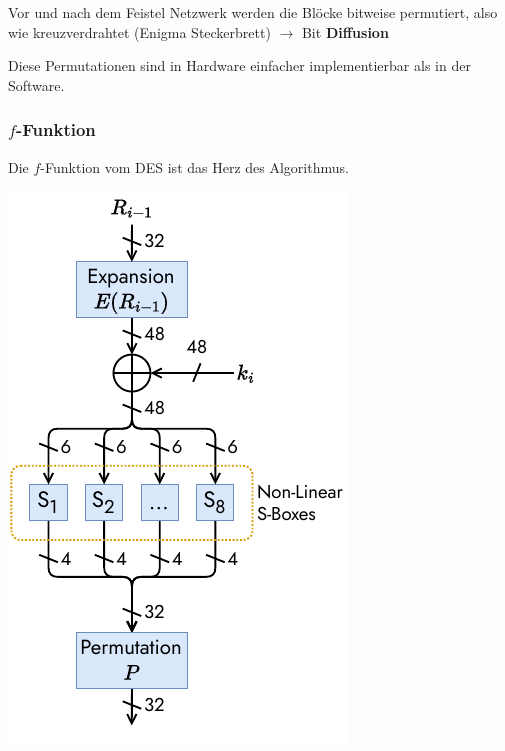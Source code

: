 \documentclass[
  10pt,
  a4paper,
  twocolumn]{article}
\begin{document}
Vor und nach dem Feistel Netzwerk werden die Blöcke bitweise permutiert,
also wie kreuzverdrahtet (Enigma Steckerbrett) \(\rightarrow\) Bit
\textbf{Diffusion}

\begin{tcolorbox}[enhanced jigsaw, colframe=quarto-callout-note-color-frame, bottomrule=.15mm, colback=white, left=2mm, toprule=.15mm, arc=.35mm, coltitle=black, opacityback=0, rightrule=.15mm, title=\textcolor{quarto-callout-note-color}{\faInfo}\hspace{0.5em}{Hinweis}, colbacktitle=quarto-callout-note-color!10!white, opacitybacktitle=0.6, toptitle=1mm, bottomtitle=1mm, titlerule=0mm, leftrule=.75mm, breakable]

Diese Permutationen sind in Hardware einfacher implementierbar als in
der Software.

\end{tcolorbox}

\subsubsection{\texorpdfstring{\(f\)-Funktion}{f-Funktion}}\label{f-funktion}

Die \(f\)-Funktion vom DES ist das Herz des Algorithmus.

\begin{center}
\includegraphics{images/crypto/des_ffunction.pdf}
\end{center}
\end{document}
